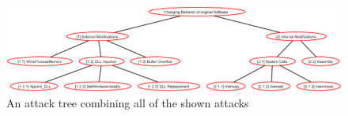 \begin{figure}[!htbp]
	\centering
	\includegraphics[angle=90,height=\textheight,keepaspectratio]{sections/adtrees/ProcessVirtualMemoryWithoutDefenses.png}
	\caption{An attack tree combining all of the shown attacks}
	\label{fig:attacks}
\end{figure}
